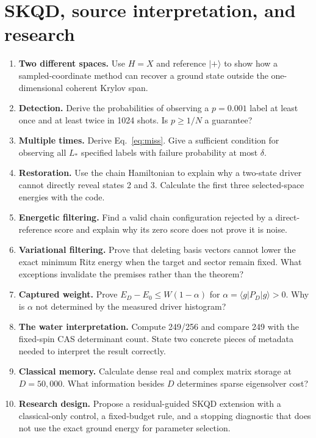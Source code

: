 \documentclass[11pt,a4paper,oneside]{report}
\newcommand{\ket}[1]{\lvert #1\rangle}
\newcommand{\bra}[1]{\langle #1\rvert}
\begin{document}
\section{SKQD, source interpretation, and research}
\begin{enumerate}[label=\textbf{\arabic*.},start=11,itemsep=8pt]
\item \textbf{Two different spaces.} Use $H=X$ and reference $\ket+$ to show how a sampled-coordinate method can recover a ground state outside the one-dimensional coherent Krylov span.
\item \textbf{Detection.} Derive the probabilities of observing a $p=0.001$ label at least once and at least twice in 1024 shots. Is $p\ge1/N$ a guarantee?
\item \textbf{Multiple times.} Derive Eq.~\eqref{eq:miss}. Give a sufficient condition for observing all $L_*$ specified labels with failure probability at most $\delta$.
\item \textbf{Restoration.} Use the chain Hamiltonian to explain why a two-state driver cannot directly reveal states 2 and 3. Calculate the first three selected-space energies with the code.
\item \textbf{Energetic filtering.} Find a valid chain configuration rejected by a direct-reference score and explain why its zero score does not prove it is noise.
\item \textbf{Variational filtering.} Prove that deleting basis vectors cannot lower the exact minimum Ritz energy when the target and sector remain fixed. What exceptions invalidate the premises rather than the theorem?
\item \textbf{Captured weight.} Prove $E_D-E_0\le W(1-\alpha)$ for $\alpha=\bra gP_D\ket g>0$. Why is $\alpha$ not determined by the measured driver histogram?
\item \textbf{The water interpretation.} Compute 249/256 and compare 249 with the fixed-spin CAS determinant count. State two concrete pieces of metadata needed to interpret the result correctly.
\item \textbf{Classical memory.} Calculate dense real and complex matrix storage at $D=50{,}000$. What information besides $D$ determines sparse eigensolver cost?
\item \textbf{Research design.} Propose a residual-guided SKQD extension with a classical-only control, a fixed-budget rule, and a stopping diagnostic that does not use the exact ground energy for parameter selection.
\end{enumerate}
\end{document}
